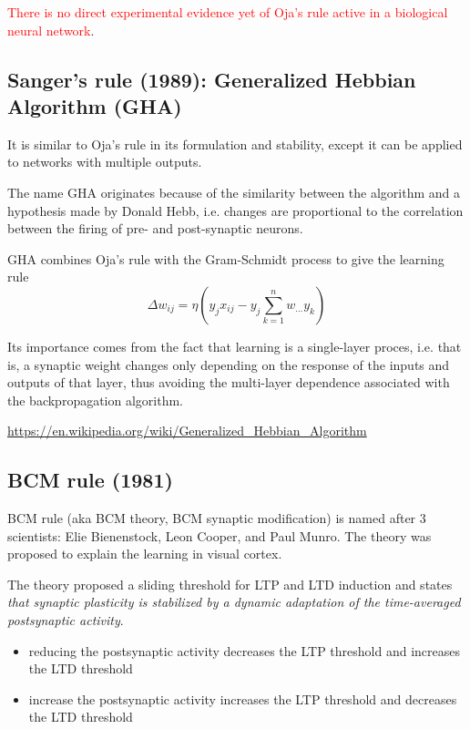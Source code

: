 \textcolor{red}{There is no direct experimental evidence yet of Oja's rule
active in a biological neural network}.

\subsection{Sanger's rule (1989): Generalized Hebbian Algorithm (GHA)}
\label{sec:Sanger-rule}

It is similar to Oja's rule in its formulation and stability, except it can be
applied to networks with multiple outputs.

The name GHA originates because of the similarity between the algorithm and a
hypothesis made by Donald Hebb, i.e. changes are proportional to the
correlation between the firing of pre- and post-synaptic neurons.

GHA combines Oja's rule with the Gram-Schmidt process to give the learning rule
\begin{equation}
\Delta w_{ij} = \eta \left( 
y_jx_{ij} - y_j \sum_{k=1}^n w_{\ldots}y_k
\right)
\end{equation}

Its importance comes from the fact that learning is a single-layer proces, i.e.
that is, a synaptic weight changes only depending on the response of the inputs
and outputs of that layer, thus avoiding the multi-layer dependence associated
with the backpropagation algorithm.

\url{https://en.wikipedia.org/wiki/Generalized_Hebbian_Algorithm}

\subsection{BCM rule (1981)}
\label{sec:BCM-rule}

BCM rule (aka BCM theory, BCM synaptic modification) is named after 3
scientists: Elie Bienenstock, Leon Cooper, and Paul Munro.
The theory was proposed to explain the learning in visual cortex.

The theory proposed a sliding threshold for LTP and LTD induction
and states 
{\it that synaptic plasticity is stabilized by a dynamic adaptation of the
time-averaged postsynaptic activity}.
\begin{itemize}
  \item reducing the postsynaptic activity decreases the LTP threshold and
  increases the LTD threshold
  
  \item increase the postsynaptic activity increases the LTP threshold and
  decreases the LTD threshold
\end{itemize}


